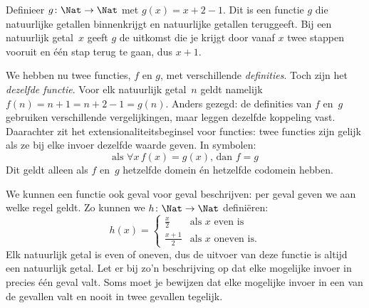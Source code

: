 \documentclass[../../../include/open-logic-section]{subfiles}
\begin{document}
\begin{ex}
Definieer $g \colon \Nat \to \Nat$ met $g(x) = x+2-1$. Dit is een functie
$g$ die natuurlijke getallen binnenkrijgt en natuurlijke getallen teruggeeft.
Bij een natuurlijk getal~$x$ geeft $g$ de uitkomst die je krijgt door vanaf
$x$ twee stappen vooruit en één stap terug te gaan, dus $x+1$.
\end{ex}

\begin{explain}
We hebben nu twee functies, $f$ en $g$, met verschillende \emph{definities}.
Toch zijn het \emph{dezelfde functie}. Voor elk natuurlijk getal~$n$ geldt
namelijk $f(n) = n+1 = n+2-1 = g(n)$. Anders gezegd: de definities van $f$
en~$g$ gebruiken verschillende vergelijkingen, maar leggen dezelfde koppeling
vast. Daarachter zit het extensionaliteitsbeginsel voor functies: twee functies
zijn gelijk als ze bij elke invoer dezelfde waarde geven. In symbolen:
\[
  \text{als }\forall x\, f(x) = g(x)\text{, dan }f = g
\]
Dit geldt alleen als $f$ en~$g$ hetzelfde domein én hetzelfde codomein hebben.
\end{explain}

\begin{ex}
We kunnen een functie ook geval voor geval beschrijven: per geval geven we aan
welke regel geldt. Zo kunnen we $h \colon \Nat \to \Nat$ definiëren:
\[
h(x) =
\begin{cases}
  \frac{x}{2} & \text{als $x$ even is} \\
  \frac{x+1}{2} & \text{als $x$ oneven is.}
\end{cases}
\]
Elk natuurlijk getal is even of oneven, dus de uitvoer van deze functie is
altijd een natuurlijk getal. Let er bij zo'n beschrijving op dat elke mogelijke
invoer in precies één geval valt. Soms moet je bewijzen dat elke mogelijke
invoer in een van de gevallen valt en nooit in twee gevallen tegelijk.
\end{ex}
\end{document}
